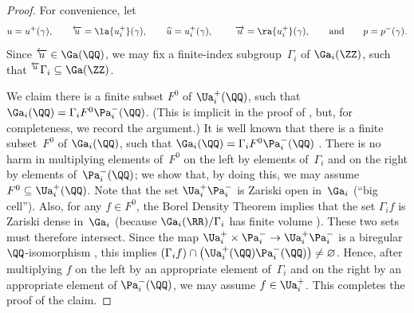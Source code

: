 \begin{proof}For convenience, let
	\[ u = u^+(\gamma), \qquad \overleftarrow{u} = \la{u^+_i}(\gamma), \qquad \widehat{u} = u^+_i(\gamma), \ \qquad \overrightarrow{u} = \ra{u^+_i}(\gamma), \qquad \text{and}\qquad p = p^-(\gamma) .\]
Since $\overleftarrow{u} \in \Ga(\QQ)$, we may fix a finite-index subgroup~$\Gamma_i$ of $\Ga_i(\ZZ)$, such that ${}^{\overleftarrow{u}}\Gamma_i \subseteq \Ga(\ZZ)$.

We claim there is a finite subset $F^0$ of $\Ua^+_i(\QQ)$, such that $\Ga_i(\QQ) = \Gamma_i F^0 \Pa_i^-(\QQ)$. (This is implicit in the proof of \cite[Lemma~4.19]{MR1828742}, but, for completeness, we record the argument.) It is well known that there is a finite subset~$F^0$ of $\Ga_i(\QQ)$, such that $\Ga_i(\QQ) = \Gamma_i F^0 \Pa_i^-(\QQ)$ \cite[Proposition~15.6]{MR0244260}. There is no harm in multiplying elements of~$F^0$ on the left by elements of~$\Gamma_i$ and on the right by elements of~$\Pa_i^-(\QQ)$; we show that, by doing this, we may assume $F^0 \subseteq \Ua^+_i(\QQ)$.
Note that the set $\Ua^+_i \Pa_i^-$ is Zariski open in~$\Ga_i$ (``big cell'').
Also, for any $f \in F^0$, the Borel Density Theorem \cite[Theorem~4.10, p.~205] {MR1278263} implies that the set $\Gamma_i f$ is Zariski dense in~$\Ga_i$ (because $\Ga_i(\RR)/\Gamma_i$ has finite volume \cite[Theorem~4.13, p.~213]{MR1278263}). These two sets must therefore intersect. Since the map $\Ua^+_i \times \Pa_i^- \to \Ua^+_i \Pa_i^-$ is a biregular $\QQ$-isomorphism \cite[Proposition~3.24, p.~84]{BorelTits-GrpRed}, this implies $(\Gamma_i f) \cap \bigl(\Ua^+_i(\QQ) \Pa_i^-(\QQ) \bigr) \neq \varnothing$. Hence, after multiplying $f$ on the left by an appropriate element of~$\Gamma_i$ and on the right by an appropriate element of $\Pa_i^-(\QQ)$, we may assume $f \in \Ua^+_i$. This completes the proof of the claim.


\end{proof}
